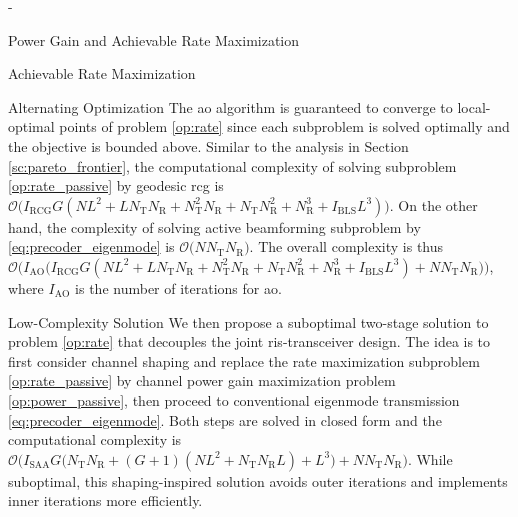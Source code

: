 \begin{section}{-}
\begin{subsection}{Power Gain and Achievable Rate Maximization}
\begin{subsubsection}{Achievable Rate Maximization}
\begin{paragraph}{Alternating Optimization}
				The \gls{ao} algorithm is guaranteed to converge to local-optimal points of problem \eqref{op:rate} since each subproblem is solved optimally and the objective is bounded above.
				Similar to the analysis in Section \ref{sc:pareto_frontier}, the computational complexity of solving subproblem \eqref{op:rate_passive} by geodesic \gls{rcg} is $\mathcal{O}\bigl(I_\text{RCG} G (NL^2 + L N_\mathrm{T} N_\mathrm{R} + N_\mathrm{T}^2 N_\mathrm{R} + N_\mathrm{T} N_\mathrm{R}^2 + N_\mathrm{R}^3 + I_\text{BLS} L^3)\bigr)$.
				On the other hand, the complexity of solving active beamforming subproblem by \eqref{eq:precoder_eigenmode} is $\mathcal{O}\bigl(N N_\mathrm{T} N_\mathrm{R}\bigr)$.
				The overall complexity is thus $\mathcal{O}\bigl(I_\text{AO}\bigl(I_\text{RCG} G (NL^2 + L N_\mathrm{T} N_\mathrm{R} + N_\mathrm{T}^2 N_\mathrm{R} + N_\mathrm{T} N_\mathrm{R}^2 + N_\mathrm{R}^3 + I_\text{BLS} L^3) + N N_\mathrm{T} N_\mathrm{R}\bigr)\bigr)$, where $I_\text{AO}$ is the number of iterations for \gls{ao}.
			\end{paragraph}

			\begin{paragraph}{Low-Complexity Solution}\label{sc:low_complexity}
				We then propose a suboptimal two-stage solution to problem \eqref{op:rate} that decouples the joint \gls{ris}-transceiver design.
				The idea is to first consider channel shaping and replace the rate maximization subproblem \eqref{op:rate_passive} by channel power gain maximization problem \eqref{op:power_passive}, then proceed to conventional eigenmode transmission \eqref{eq:precoder_eigenmode}.
				Both steps are solved in closed form and the computational complexity is $\mathcal{O}\bigl(I_\text{SAA} G \bigl(N_\mathrm{T} N_\mathrm{R} + (G+1)(NL^2+N_\mathrm{T} N_\mathrm{R} L) + L^3\bigr) + N N_\mathrm{T} N_\mathrm{R}\bigr)$.
				While suboptimal, this shaping-inspired solution avoids outer iterations and implements inner iterations more efficiently.
			\end{paragraph}
		\end{subsubsection}
	\end{subsection}

\end{section}

